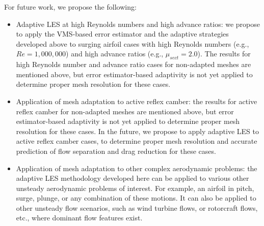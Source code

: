 For future work, we propose the following:

\begin{itemize}
	\item Adaptive LES at high Reynolds numbers and high advance ratios:
	we propose to apply the VMS-based error estimator and the adaptive strategies developed above to
	surging airfoil cases with high Reynolds numbers (e.g., $Re=1,000,000$) and high advance ratios (e.g., $\mu_{sect}=2.0$). The results for high Reynolds number and advance ratio cases for non-adapted meshes are mentioned above, but error estimator-based adaptivity is not yet applied to determine proper mesh resolution for these cases.
	
	\item Application of mesh adaptation to active reflex camber:
	the results for active reflex camber for non-adapted meshes are mentioned above, but error estimator-based	adaptivity is not yet applied to determine proper mesh resolution for these cases. In the future, we propose to apply adaptive LES to active reflex camber cases, to determine proper mesh resolution and accurate prediction of flow separation and drag reduction for these cases.
	
	\item Application of mesh adaptation to other complex aerodynamic problems:
	the adaptive LES methodology developed here can be applied to various other unsteady aerodynamic problems of interest. For example, an airfoil in pitch, surge, plunge, or any combination of these motions.
	It can also be applied to other unsteady flow scenarios, such as wind turbine flows, or rotorcraft flows, etc., where dominant flow features exist. 
	
	
	
\end{itemize}
